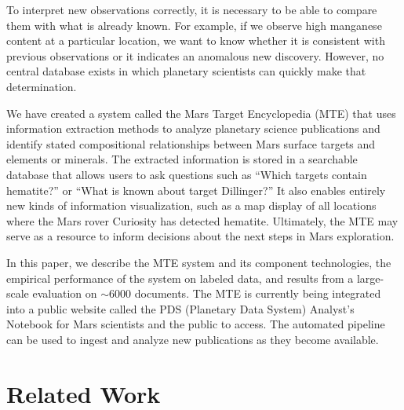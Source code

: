 \documentclass[letterpaper]{article} %
\begin{document}
To interpret new observations correctly, it is necessary to be able to
compare them with what is already known.  For example, if we observe
high manganese content at a particular location, we want to know
whether it is consistent with previous observations or it indicates an
anomalous new discovery.  However, no central database exists in which
planetary scientists can quickly make that determination.

We have created a system called the Mars Target Encyclopedia (MTE)
that uses information extraction methods to analyze planetary science
publications and identify stated compositional relationships between Mars
surface targets and elements or minerals.  The extracted information
is stored in a searchable database that allows users to ask questions
such as ``Which targets contain hematite?'' or ``What is known about
target Dillinger?''  It also enables entirely new kinds of information
visualization, such as a map display of all locations where the Mars
rover Curiosity has detected hematite.  Ultimately, the MTE may serve 
as a resource to inform
decisions about the next steps in Mars exploration.  


In this paper, we describe the MTE system and its component
technologies, the empirical performance of the system on labeled data,
and results from a large-scale evaluation on $\sim$6000 documents.
The MTE is currently being integrated into a public website called the
PDS (Planetary Data System) Analyst's Notebook for Mars scientists
and the public to access.  The automated pipeline can be used to
ingest and analyze new publications as they become available.


\section{Related Work}
\end{document}
